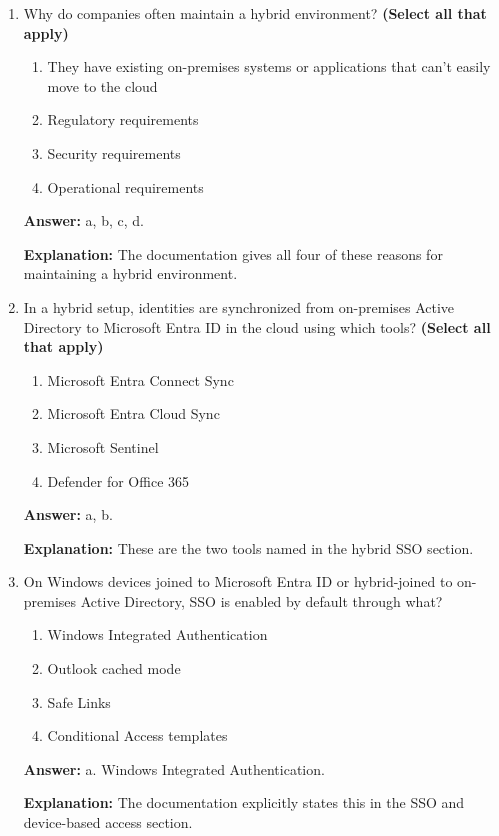 \documentclass[10pt]{article}
\begin{document}
\begin{enumerate}[leftmargin=*]
\textbf{Explanation:} The documentation names these organizations specifically.

\item Why do companies often maintain a hybrid environment? \textbf{(Select all that apply)}
\begin{enumerate}[label=\alph*., leftmargin=1.5em]
\item They have existing on-premises systems or applications that can’t easily move to the cloud
\item Regulatory requirements
\item Security requirements
\item Operational requirements
\end{enumerate}
\textbf{Answer:} a, b, c, d.

\textbf{Explanation:} The documentation gives all four of these reasons for maintaining a hybrid environment.

\item In a hybrid setup, identities are synchronized from on-premises Active Directory to Microsoft Entra ID in the cloud using which tools? \textbf{(Select all that apply)}
\begin{enumerate}[label=\alph*., leftmargin=1.5em]
\item Microsoft Entra Connect Sync
\item Microsoft Entra Cloud Sync
\item Microsoft Sentinel
\item Defender for Office 365
\end{enumerate}
\textbf{Answer:} a, b.

\textbf{Explanation:} These are the two tools named in the hybrid SSO section.

\item On Windows devices joined to Microsoft Entra ID or hybrid-joined to on-premises Active Directory, SSO is enabled by default through what?
\begin{enumerate}[label=\alph*., leftmargin=1.5em]
\item Windows Integrated Authentication
\item Outlook cached mode
\item Safe Links
\item Conditional Access templates
\end{enumerate}
\textbf{Answer:} a. Windows Integrated Authentication.

\textbf{Explanation:} The documentation explicitly states this in the SSO and device-based access section.


\end{enumerate}
\end{document}

